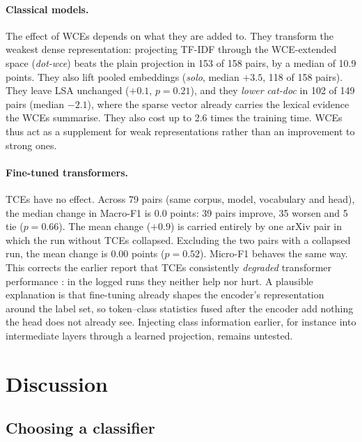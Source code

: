 \documentclass{ijis}
\begin{document}
\paragraph{Classical models.} The effect of WCEs depends on what they are added to. They transform the weakest dense representation: projecting TF-IDF through the WCE-extended space (\emph{dot-wce}) beats the plain projection in 153 of 158 pairs, by a median of 10.9 points. They also lift pooled embeddings (\emph{solo}, median $+3.5$, 118 of 158 pairs). They leave LSA unchanged ($+0.1$, $p = 0.21$), and they \emph{lower} \emph{cat-doc} in 102 of 149 pairs (median $-2.1$), where the sparse vector already carries the lexical evidence the WCEs summarise. They also cost up to 2.6 times the training time. WCEs thus act as a supplement for weak representations rather than an improvement to strong ones.

\paragraph{Fine-tuned transformers.} TCEs have no effect. Across 79 pairs (same corpus, model, vocabulary and head), the median change in Macro-F1 is 0.0 points: 39 pairs improve, 35 worsen and 5 tie ($p = 0.66$). The mean change ($+0.9$) is carried entirely by one arXiv pair in which the run without TCEs collapsed. Excluding the two pairs with a collapsed run, the mean change is 0.00 points ($p = 0.52$). Micro-F1 behaves the same way. This corrects the earlier report that TCEs consistently \emph{degraded} transformer performance \cite{worth2025layercake}: in the logged runs they neither help nor hurt. A plausible explanation is that fine-tuning already shapes the encoder's representation around the label set, so token--class statistics fused after the encoder add nothing the head does not already see. Injecting class information earlier, for instance into intermediate layers through a learned projection, remains untested.

\section{Discussion}\label{sec:discussion}

\subsection{Choosing a classifier}
\end{document}
